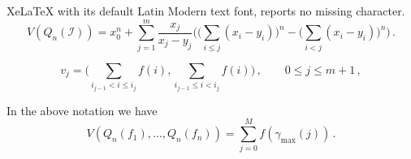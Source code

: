 \documentclass[10pt,a4paper]{amsart}
\newcommand{\I}{\mathscr{I}}
\begin{document}
XeLaTeX with its default Latin Modern text font, reports no missing character.
\begin{equation} \label{eq:vqn2}
	V(Q_n(\I)) = x_{0}^n
	+ \sum_{j=1}^{m}\frac{x_{j}}{x_{j}-y_{j}}\Big(\big(\sum_{i\le j}(x_{i}-y_{i})\big)^n-\big(\sum_{i<j}(x_{i}-y_{i})\big)^n\Big)\,.
\end{equation}

\begin{equation} \label{eq:q2f_sides}
	v_j = \Big(\sum_{i_{j-1}<i\le i_j}f(i),\sum_{i_{j-1}\le i<i_{j}}f(i)\Big)\,,
	\qquad 0\le j\le m+1\,,
\end{equation}

\begin{lemma} \label{lem:mixedvolumesmaller}
	In the above notation we have
	\begin{equation}
		V(Q_n(f_1),\dots,Q_n(f_n)) = \sum_{j=0}^{M}f(\gamma_{\mathrm{max}}(j))\,.
	\end{equation}
\end{lemma}
\end{document}
